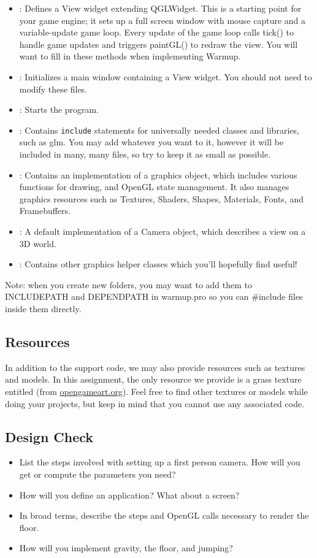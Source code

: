 \documentclass{../cs195u}
\begin{document}
  \begin{itemize}
   \item {}: Defines a View widget extending QGLWidget. This is a starting point for your game engine; it sets up a full screen window with mouse capture and a variable-update game loop. Every update of the game loop calls tick() to handle game updates and triggers paintGL() to redraw the view. You will want to fill in these methods when implementing Warmup.
   \item {}: Initializes a main window containing a View widget. You should not need to modify these files.
   \item {}: Starts the program.
   \item {}: Contains \texttt{include} statements for universally needed classes and libraries, such as glm. You may add whatever you want to it, however it will be included in many, many files, so try to keep it as small as possible.
\item {}: Contains an implementation of a graphics object, which
includes various functions for drawing, and OpenGL state management. It also manages
graphics resources such as Textures, Shaders, Shapes, Materials, Fonts, and Framebuffers.
\item {}: A default implementation of a Camera object, which describes
a view on a 3D world.
\item {}: Contains other graphics helper classes which you’ll hopefully find useful!
  \end{itemize}

  Note: when you create new folders, you may want to add them to INCLUDEPATH and DEPENDPATH in warmup.pro so you can \#include files inside them directly.

  \subsection*{Resources}
  In addition to the support code, we may also provide resources such as textures and models. In this assignment, the only resource we provide is a grass texture entitled  (from \url{opengameart.org}). Feel free to find other textures or models while doing your projects, but keep in mind that you cannot use any associated code.
  \newpage

  \subsection*{Design Check}
  \begin{itemize}
   \item List the steps involved with setting up a first person camera. How will you get or compute the parameters you need?
   \item How will you define an application? What about a screen?
   \item In broad terms, describe the steps and OpenGL calls necessary to render the floor.
   \item How will you implement gravity, the floor, and jumping?
  \end{itemize}
  
\end{document}
